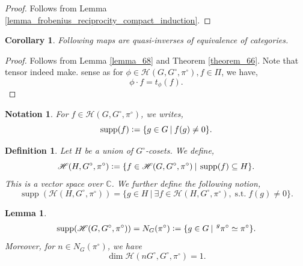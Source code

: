 \documentclass[8pt]{article}
\newtheorem{definition}{Definition}[section]
\newtheorem{lemma}{Lemma}[section]
\newtheorem{notation}{Notation}[section]
\newtheorem{corollary}{Corollary} [section]
\DeclareMathOperator{\st}{s.t.}
\DeclareMathOperator{\Rep}{Rep}
\DeclareMathOperator{\Hom}{Hom}
\DeclareMathOperator{\Mod}{Mod}
\DeclareMathOperator{\supp}{supp}
\newcommand{\defeq}{\vcentcolon=}
\newcommand{\C}[0]{\mathbb{C}}
\newcommand{\sep}[0]{\:|\:}
\newcommand{\hecke}[0]{\mathscr{H}}
\newcommand{\tens}[1]{%
  \mathbin{\mathop{\otimes}\displaylimits_{#1}}%
}
\begin{document}
\begin{proof}
  Follows from Lemma \ref{lemma_frobenius_reciprocity_compact_induction}.
\end{proof}
\begin{corollary}
  Following maps are quasi-inverses of equivalence of categories.
  \label{corollary_69}
  \begin{center}
  \end{center}
\end{corollary}
\begin{proof}
  Follows from Lemma \ref{lemma_68} and Theorem \ref{theorem_66}.
  Note that tensor indeed make. sense as for $\phi\in\hecke(G,G^\circ,\pi^\circ),f\in\Pi$, we have,
  \begin{equation*}
    \phi\cdot f = t_\phi(f).
  \end{equation*}
\end{proof}
\begin{notation}
  For $f\in\hecke(G,G^\circ,\pi^\circ)$, we writes,
  \begin{equation*}
    \supp(f)\defeq\{g\in G\sep f(g)\not=0\}.
  \end{equation*}
\end{notation}
\begin{definition}
  Let $H$ be a union of $G^\circ$-cosets. We define,
  \begin{equation*}
    \hecke(H,G^\circ,\pi^\circ) \defeq\{f\in\hecke(G,G^\circ,\pi^\circ)\sep \supp(f)\subseteq H\}.
  \end{equation*}
  This is a vector space over $\C$. We further define the following notion,
  \begin{equation*}
    \supp(\hecke(H,G^\circ,\pi^\circ)) = \{g\in H\sep \exists f\in\hecke(H,G^\circ,\pi^\circ), \st f(g)\not=0\}.
  \end{equation*}
\end{definition}
\begin{lemma}
  \label{lemma_70}
  \begin{align*}
    \supp(\hecke(G,G^\circ,\pi^\circ))  = N_G(\pi^\circ) \defeq \{g\in G\sep \prescript{g}{}{\pi^\circ}\simeq\pi^\circ\}.
  \end{align*}
  Moreover, for $n\in N_G(\pi^\circ)$, we have 
  \begin{equation*}
    \dim\hecke(nG^\circ,G^\circ,\pi^\circ) = 1.
  \end{equation*}
\end{lemma}
\end{document}
